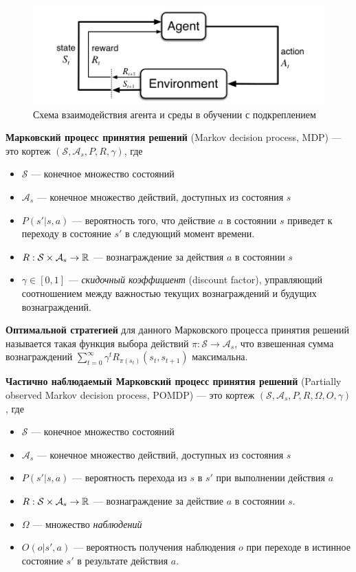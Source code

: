 \documentclass[specification, annotation]{itmo-student-thesis}
\begin{document}
\begin{figure}[!h]
  \caption{Схема взаимодействия агента и среды в обучении с подкреплением}\label{rl-scheme}
  \centering
  \includegraphics[scale=0.5]{rl-scheme}
\end{figure}

\textbf{Марковский процесс принятия решений} (Markov decision process, MDP) \cite{wiki:mdp} ---
это кортеж
$(\mathcal{S}, \mathcal{A}_s, P, R, \gamma)$, где

\begin{itemize}
\item $\mathcal{S}$ --- конечное множество состояний
\item $\mathcal{A}_s$ --- конечное множество действий, доступных из состояния
  $s$
\item $P(s' | s, a)$ --- вероятность того, что действие $a$ в состоянии $s$
  приведет к переходу в состояние $s'$ в следующий момент времени.
\item $R : \mathcal{S} \times \mathcal{A}_s \rightarrow \Bbb{R}$ ---
  вознаграждение за действия $a$ в состоянии $s$
\item $\gamma \in [0, 1]$ --- \textit{скидочный коэффициент} (discount factor),
  управляющий соотношением между важностью текущих вознаграждений и будущих вознаграждений.
\end{itemize}

\textbf{Оптимальной стратегией} для данного Марковского процесса принятия
решений называется такая функция выбора действий $\pi : \mathcal{S} \rightarrow \mathcal{A}_s$,
что взвешенная сумма вознаграждений $\sum\limits_{t=0}^{\infty} {\gamma^t
  R_{\pi(s_t)}(s_t, s_{t+1})}$ максимальна.

\textbf{Частично наблюдаемый Марковский процесс принятия решений} (Partially
observed Markov decision process, POMDP) \cite{wiki:pomdp} --- это кортеж
$(\mathcal{S}, \mathcal{A}_s, P, R, \Omega, O, \gamma)$, где
\begin{itemize}
\item $\mathcal{S}$ --- конечное множество состояний
\item $\mathcal{A}_s$ --- конечное множество действий, доступных из состояния $s$
\item $P(s' | s, a)$ --- вероятность перехода из $s$ в $s'$ при выполнении
  действия $a$
\item $R : \mathcal{S} \times \mathcal{A}_s \rightarrow \Bbb{R}$ ---
  вознаграждение за действие $a$ в состоянии $s$.
\item $\Omega$ --- множество \textit{наблюдений}
\item $O(o | s', a)$ --- вероятность получения наблюдения $o$ при переходе в
  истинное состояние $s'$ в результате действия $a$. 
\end{itemize}
\end{document}
